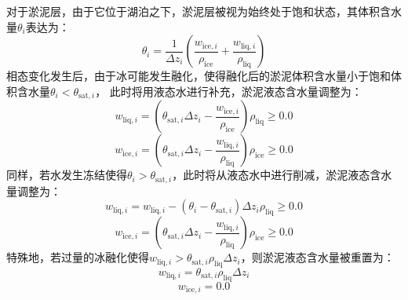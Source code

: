 对于淤泥层，由于它位于湖泊之下，淤泥层被视为始终处于饱和状态，其体积含水量$\theta_i$表达为：
\begin{equation}
  \theta_{i}=\frac{1}{\Delta z_{i}}\left(\frac{w_{\mathrm{ice},i}}{\rho_{\mathrm{ice}}}+\frac{w_{\mathrm{liq},i}}{\rho_{\mathrm{liq}}}\right)
\end{equation}
相态变化发生后，由于冰可能发生融化，使得融化后的淤泥体积含水量小于饱和体积含水量$\theta_i<\theta_{\mathrm{sat},i}$，
此时将用液态水进行补充，淤泥液态含水量调整为：
\begin{equation}
  w_{\mathrm{liq},i}=\left(\theta_{\mathrm{sat},i} \Delta z_{i}-\frac{w_{\mathrm{ice},i}}{\rho_{\mathrm{ice}}}\right) \rho_{\mathrm{liq}} \geqslant 0.0
\end{equation}
\begin{equation}
  w_{\mathrm{ice},i}=\left(\theta_{\mathrm{sat},i} \Delta z_{i}-\frac{w_{\mathrm{liq},i}}{\rho_{\mathrm{liq}}}\right) \rho_{\mathrm{ice}} \geqslant 0.0
\end{equation}
同样，若水发生冻结使得$\theta_i>\theta_{\mathrm{sat},i}$，此时将从液态水中进行削减，淤泥液态含水量调整为：
\begin{equation}
  w_{\mathrm{liq},i}=w_{\mathrm{liq},i}-\left(\theta_{i}-\theta_{\mathrm{sat},i}\right) \Delta z_{i} \rho_{\mathrm{liq}} \geqslant 0.0
\end{equation}
\begin{equation}
  w_{\mathrm{ice},i}=\left(\theta_{\mathrm{sat},i} \Delta z_{i}-\frac{w_{\mathrm{liq},i}}{\rho_{\mathrm{liq}}}\right) \rho_{\mathrm{ice}} \geqslant 0.0
\end{equation}
特殊地，若过量的冰融化使得$w_{\mathrm{liq},i}>\theta_{\mathrm{sat},i}\rho_{\mathrm{liq}}\Delta z_i$，则淤泥液态含水量被重置为：
\begin{equation}
  w_{\mathrm{liq},i}=\theta_{\mathrm{sat},i} \rho_{\mathrm{liq}} \Delta z_{i}
\end{equation}
\begin{equation}
  w_{\mathrm{ice},i}=0.0
\end{equation}


